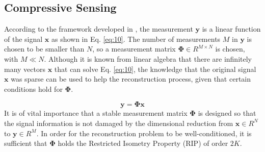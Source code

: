 \subsection{Compressive Sensing}
\label{sec:compressive-sensing}

According to the framework developed in \cite{Candes2006, Candes2006a, Donoho2006}, the measurement $\boldsymbol{y}$ is a linear function of the signal $\boldsymbol{x}$ as shown in Eq. \eqref{eq:10}. The number of measurements $M$ in $\boldsymbol{y}$ is chosen to be smaller than $N$, so a measurement matrix $\boldsymbol{\Phi} \in R^{M \times N}$ is chosen, with $M \ll N$. Although it is known from linear algebra that there are infinitely many vectors $\boldsymbol{x}$ that can solve Eq. \eqref{eq:10}, the knowledge that the original signal $\boldsymbol{x}$ was sparse can be used to help the reconstruction process, given that certain conditions hold for $\boldsymbol{\Phi}$. 

%
\begin{equation}
  \label{eq:10}
\boldsymbol{y} =\boldsymbol{\Phi x}
\end{equation}
It is of vital importance that a stable measurement matrix $\boldsymbol{\Phi}$ is designed so that the signal information is not damaged by the dimensional reduction from $\boldsymbol{x} \in R^N$ to $\boldsymbol{y} \in R^M$. In order for the reconstruction problem to be well-conditioned, it is sufficient that ${\boldsymbol{\Phi}}$ holds the Restricted Isometry Property (RIP) \cite{Donoho2006} of order $2K$. 


